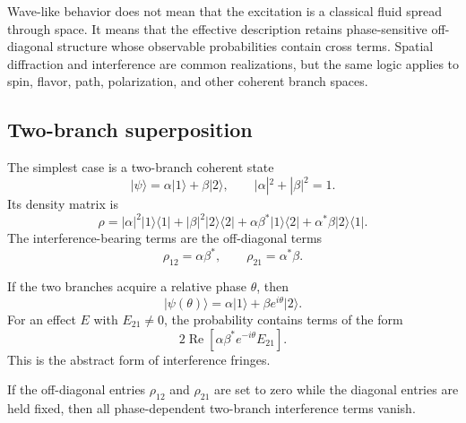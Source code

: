 \documentclass[11pt]{article}
\begin{document}
\begin{remark}
\label{rem:wave-like-phase-sensitive}
Wave-like behavior does not mean that the excitation is a classical fluid spread through space.
It means that the effective description retains phase-sensitive off-diagonal structure whose
observable probabilities contain cross terms. Spatial diffraction and interference are common
realizations, but the same logic applies to spin, flavor, path, polarization, and other coherent
branch spaces.
\end{remark}

\subsection{Two-branch superposition}
\label{subsec:two-branch-superposition}

The simplest case is a two-branch coherent state
\begin{equation}
  |\psi\rangle
  =
  \alpha|1\rangle+\beta|2\rangle,
  \qquad
  |\alpha|^2+|\beta|^2=1.
  \label{eq:two-branch-state}
\end{equation}
Its density matrix is
\begin{equation}
  \rho
  =
  |\alpha|^2|1\rangle\langle1|
  +
  |\beta|^2|2\rangle\langle2|
  +
  \alpha\beta^\ast|1\rangle\langle2|
  +
  \alpha^\ast\beta|2\rangle\langle1|.
  \label{eq:two-branch-density}
\end{equation}
The interference-bearing terms are the off-diagonal terms
\begin{equation}
  \rho_{12}=\alpha\beta^\ast,
  \qquad
  \rho_{21}=\alpha^\ast\beta.
\end{equation}

If the two branches acquire a relative phase \(\theta\), then
\begin{equation}
  |\psi(\theta)\rangle
  =
  \alpha|1\rangle+\beta e^{i\theta}|2\rangle.
\end{equation}
For an effect \(E\) with \(E_{21}\neq0\), the probability contains terms of the form
\begin{equation}
  2\operatorname{Re}
  \left[
    \alpha\beta^\ast e^{-i\theta}E_{21}
  \right].
  \label{eq:two-branch-interference-term}
\end{equation}
This is the abstract form of interference fringes.

\begin{corollary}
\label{cor:loss-coherence-removes-interference}
If the off-diagonal entries \(\rho_{12}\) and \(\rho_{21}\) are set to zero while the diagonal
entries are held fixed, then all phase-dependent two-branch interference terms vanish.
\end{corollary}
\end{document}
